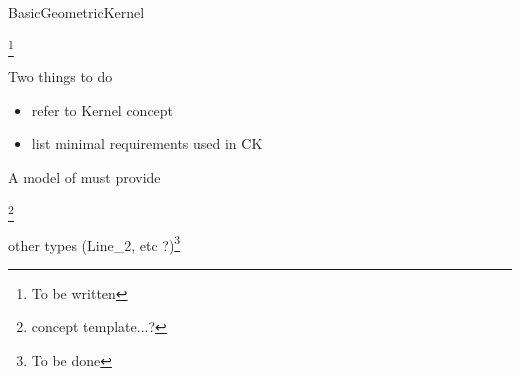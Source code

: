 \begin{ccRefConcept}{BasicGeometricKernel} 

\footnote{To be written}

Two things to do
\begin{itemize}
\item {} refer to Kernel concept
\item {} list minimal requirements used in CK
\end{itemize}

\ccTypes

A model of  must provide

 \footnote{concept template...?}

other types (Line\_2, etc ?)\footnote{To be done}

\ccHasModels


\ccSeeAlso


\end{ccRefConcept}
